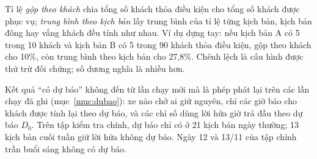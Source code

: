 Tỉ lệ \emph{gộp theo khách} chia tổng số khách thỏa điều kiện cho tổng số khách được phục vụ; \emph{trung bình theo
kịch bản} lấy trung bình của tỉ lệ từng kịch bản, kịch bản đông hay vắng khách đều tính như nhau. Ví dụ dựng tay:
nếu kịch bản A có 5 trong 10 khách và kịch bản B có 5 trong 90 khách thỏa điều kiện, gộp theo khách cho 10\%, còn
trung bình theo kịch bản cho 27,8\%. Chênh lệch là cấu hình được thử trừ đối chứng; số dương nghĩa là nhiều hơn.

Kết quả ``có dự báo'' không đến từ lần chạy mới mà là phép phát lại trên các lần chạy đã ghi
(mục~\ref{muc:dubao}): xe nào chở ai giữ nguyên, chỉ các giờ báo cho khách được tính lại theo dự báo, và các chỉ số
dùng lời hứa giờ trả đầu theo dự báo $D_0$. Trên tập kiểm tra chính, dự báo chỉ có ở 21 kịch bản ngày thường; 13
kịch bản cuối tuần giữ lời hứa không dự báo. Ngày 12 và 13/11 của tập chỉnh trần buổi sáng không có dự báo.

